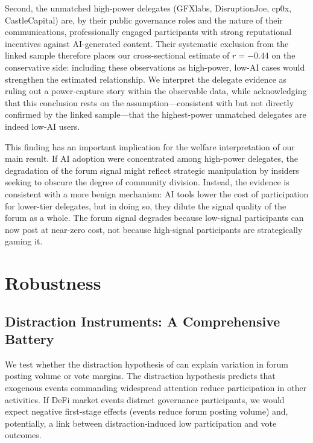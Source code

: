 \documentclass[12pt]{article}
\begin{document}
Second, the unmatched high-power delegates (GFXlabs, DisruptionJoe, cp0x,
CastleCapital) are, by their public governance roles and the nature of their
communications, professionally engaged participants with strong reputational
incentives against AI-generated content. Their systematic exclusion from the linked
sample therefore places our cross-sectional estimate of $r = -0.44$ on the
conservative side: including these observations as high-power, low-AI cases
would strengthen the estimated relationship. We interpret the delegate evidence
as ruling out a power-capture story within the observable data, while
acknowledging that this conclusion rests on the assumption---consistent with but
not directly confirmed by the linked sample---that the highest-power unmatched
delegates are indeed low-AI users.

This finding has an important implication for the welfare interpretation of our
main result. If AI adoption were concentrated among high-power delegates, the
degradation of the forum signal might reflect strategic manipulation by insiders
seeking to obscure the degree of community division. Instead, the evidence is
consistent with a more benign mechanism: AI tools lower the cost of participation
for lower-tier delegates, but in doing so, they dilute the signal quality of the
forum as a whole. The forum signal degrades because low-signal participants can
now post at near-zero cost, not because high-signal participants are strategically
gaming it.



\section{Robustness}
\label{sec:robustness}


\subsection{Distraction Instruments: A Comprehensive Battery}

We test whether the distraction hypothesis of \citet{hirshleifer2009} can explain
variation in forum posting volume or vote margins. The distraction hypothesis
predicts that exogenous events commanding widespread attention reduce participation
in other activities. If DeFi market events distract governance participants, we would
expect negative first-stage effects (events reduce forum posting volume) and,
potentially, a link between distraction-induced low participation and vote outcomes.
\end{document}

